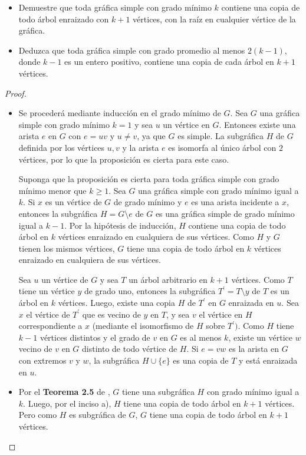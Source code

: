 \documentclass[12pt]{article}
\newenvironment{problem}[2][Problema]{\begin{trivlist}
\item[\hskip \labelsep {\bfseries #1}\hskip \labelsep {\bfseries #2.}]}{\end{trivlist}}
\begin{document}
\begin{problem}{4.1.9} \text{}
\begin{itemize}
    \item[a)] Demuestre que toda gráfica simple con grado mínimo $k$ contiene una copia de todo árbol enraizado con $k+1$ vértices, con la raíz en cualquier vértice de la gráfica.
    \item[b)] Deduzca que toda gráfica simple con grado promedio al menos $2(k-1)$, donde $k-1$ es un entero positivo, contiene una copia de cada árbol en $k+1$ vértices.
\end{itemize}
\end{problem}
\begin{proof}
\textbf{}
\begin{itemize}
    \item[a)] Se procederá mediante inducción en el grado mínimo de $G$. Sea $G$ una gráfica simple con grado mínimo $k=1$ y sea $u$ un vértice en $G.$ Entonces existe una arista $e$ en $G$ con $e = uv$ y $u \neq v$, ya que $G$ es simple. La subgráfica $H$ de $G$ definida por los vértices $u,v$ y la arista $e$ es isomorfa al único árbol con $2$ vértices, por lo que la proposición es cierta para este caso.
    
    Suponga que la proposición es cierta para toda gráfica simple con grado mínimo menor que $k \geq 1.$  Sea $G$ una gráfica simple con grado mínimo igual a $k$. Si $x$ es un vértice de $G$ de grado mínimo y $e$ es una arista incidente a $x$, entonces la subgráfica $H = G\setminus e$ de $G$ es una gráfica simple de grado mínimo igual a $k-1$. Por la hipótesis de inducción, $H$ contiene una copia de todo árbol en $k$ vértices enraizado en cualquiera de sus vértices. Como $H$ y $G$ tienen los mismos vértices, $G$ tiene una copia de todo árbol en $k$ vértices enraizado en cualquiera de sus vértices.
    
    Sea $u$ un vértice de $G$ y sea $T$ un árbol arbitrario en $k+1$ vértices. Como $T$ tiene un vértice $y$ de grado uno, entonces la subgráfica $T^\prime = T\setminus y$  de $T$ es un árbol en $k$ vértices. Luego, existe una copia $H$ de $T^\prime $ en $G$ enraizada en $u.$ Sea $x$ el vértice de $T^\prime$ que es vecino de $y$ en $T$, y sea $v$ el vértice en $H$ correspondiente a $x$ (mediante el isomorfismo de $H$ sobre $T^\prime).$ Como $H$ tiene $k-1$ vértices distintos y el grado de $v$ en $G$ es al menos $k$, existe un vértice $w$ vecino de $v$ en $G$ distinto de todo vértice de $H.$ Si $e = vw$ es la arista en $G$ con extremos $v$ y $w$,  la subgráfica $H \cup \{e\}$ es una copia de $T$ y está enraizada en $u$. 
    \item[b)] Por el \textbf{Teorema 2.5} de \cite{10.5555/1481153}, $G$ tiene una subgráfica $H$ con grado mínimo igual a $k.$ Luego, por el inciso a), $H$ tiene una copia de todo árbol en $k+1$ vértices. Pero como $H$ es subgráfica de $G$, $G$ tiene una copia de todo árbol en $k+1$ vértices.
 \end{itemize}
\end{proof}
\end{document}
